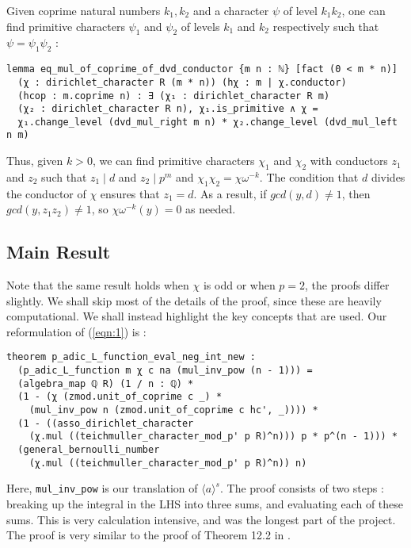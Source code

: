 \documentclass[a4paper,UKenglish,cleveref, autoref, thm-restate]{lipics-v2021}
\newcommand{\lean}[1]{\texttt{#1}\xspace} %
\begin{document}
Given coprime natural numbers $k_1, k_2$ and a character $\psi$ of level $k_1 k_2$, one can find primitive characters 
$\psi_1$ and $\psi_2$ of levels $k_1$ and $k_2$ respectively such that $\psi = \psi_1 \psi_2$ : 
\begin{lstlisting}
lemma eq_mul_of_coprime_of_dvd_conductor {m n : ℕ} [fact (0 < m * n)] 
  (χ : dirichlet_character R (m * n)) (hχ : m | χ.conductor) 
  (hcop : m.coprime n) : ∃ (χ₁ : dirichlet_character R m) 
  (χ₂ : dirichlet_character R n), χ₁.is_primitive ∧ χ = 
  χ₁.change_level (dvd_mul_right m n) * χ₂.change_level (dvd_mul_left n m) 
\end{lstlisting}
Thus, given $k > 0$, we can find primitive characters $\chi_1$ and $\chi_2$ with conductors $z_1$ and $z_2$ such that 
$z_1 \mid d$ and $z_2 \mid p^m$ and $\chi_1 \chi_2 = \chi \omega^{-k}$. The condition that $d$ divides the conductor of $\chi$ ensures 
that $z_1 = d$. As a result, if $gcd (y, d) \ne 1$, then $gcd (y, z_1 z_2) \ne 1$, so $\chi \omega^{-k} (y) = 0$ as needed.

\subsection{Main Result}
Note that the same result holds when $\chi$ is odd or when $p = 2$, the proofs differ slightly. We shall 
skip most of the details of the proof, since these are heavily computational. We shall instead highlight the key concepts 
that are used. Our reformulation of (\ref{eqn:1}) is :
\begin{lstlisting}
theorem p_adic_L_function_eval_neg_int_new :
  (p_adic_L_function m χ c na (mul_inv_pow (n - 1))) = 
  (algebra_map ℚ R) (1 / n : ℚ) *
  (1 - (χ (zmod.unit_of_coprime c _) * 
    (mul_inv_pow n (zmod.unit_of_coprime c hc', _)))) * 
  (1 - ((asso_dirichlet_character 
    (χ.mul ((teichmuller_character_mod_p' p R)^n))) p * p^(n - 1))) * 
  (general_bernoulli_number 
    (χ.mul ((teichmuller_character_mod_p' p R)^n)) n) 
\end{lstlisting}
Here, \lean{mul\_inv\_pow} is our translation of $\langle a \rangle ^s$. \newline
The proof consists of two steps : breaking up the integral in the LHS into three sums, 
and evaluating each of these sums. This is very calculation intensive, and was the longest part of the project. 
The proof is very similar to the proof of Theorem 12.2 in \cite{cyc}. 
\end{document}
